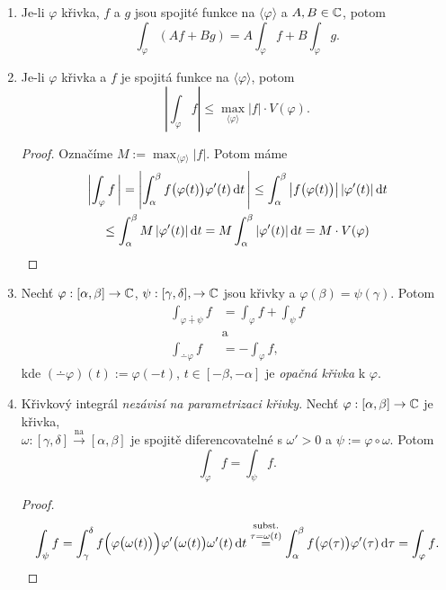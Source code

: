 \begin{propertiesBasic}
\mbox{}
\vspace{-2em}
\begin{enumerate}
    \item Je-li $\varphi$ křivka, $f$ a $g$ jsou spojité funkce na $\langle\varphi\rangle$ a $A,B \in \operatorname{\mathbb{C}}  $, potom $$\int_\varphi (Af+Bg)=A\int_\varphi f+B\int_\varphi g.$$
    \item Je-li $\varphi$ křivka a $f$ je spojitá funkce na $\langle\varphi\rangle$, potom $$\left|\int_\varphi f\right|\leq\max_{\langle\varphi\rangle}|f|\cdot V(\varphi).$$
    \begin{proof}
     Označíme $M:=\max_{\langle\varphi\rangle}|f|$. Potom máme
     \begin{multline*}
     \left|\int_\varphi f\, \right|=
     \left| \int_\alpha^\beta f\bigl(\varphi(t)\bigr) \varphi'(t) \mathop{}\!\mathrm{d} t \, \right|
     \leq\int_\alpha^\beta\left|f\bigl(\varphi(t)\bigr)\right|\left|\varphi'(t)\right|\mathop{}\!\mathrm{d} t\\
     \leq\int_\alpha^\beta M\left|\varphi'(t)\right|\mathop{}\!\mathrm{d} t =M\int_\alpha^\beta \left|\varphi'(t)\right|\mathop{}\!\mathrm{d} t
     = M\cdot V(\varphi)
     \end{multline*}
    \end{proof}
    \item Nechť %
    $\varphi:[\alpha,\beta]\rightarrow\operatorname{\mathbb{C}}  $, $\psi:[\gamma,\delta],\rightarrow\operatorname{\mathbb{C}}  $ jsou křivky a $\varphi(\beta)=\psi(\gamma)$. Potom 
    \begin{align*}
        \int_{\varphi\dotplus\psi}f&=\int_\varphi f+\int_\psi f \\ 
        &\text{a} \\
        \int_{\dotminus \varphi}f&=-\int_\varphi f\text{,}
    \end{align*}
    kde $(\dotminus \varphi)(t):=\varphi(-t)$, $t\in[-\beta,-\alpha]$ je \emph{opačná křivka} k %
    $\varphi$.
    \item Křivkový integrál \emph{nezávisí na parametrizaci křivky}. Nechť $\varphi:[\alpha,\beta]\rightarrow\operatorname{\mathbb{C}}  $ je křivka,\\
    $\omega:[\gamma,\delta]\xrightarrow{\text{na}}[\alpha,\beta]$ je spojitě diferencovatelné s $\omega'>0$ a $\psi:=\varphi\circ\omega$. %
    Potom $$\int_\varphi f = \int_\psi f\text{.}$$
    \begin{proof}
    \begin{equation*}
        \int_\psi f=
    \int_\gamma^\delta f\Bigl(\varphi\bigl(\omega(t)\bigr)\Bigr) \varphi'\bigl(\omega(t)\bigr)\omega'(t)\mathop{}\!\mathrm{d} t
     \stackrel{\text{subst.}}{\stackrel{\tau=\omega(t)}{=}}
    \int_\alpha^\beta f\bigl(\varphi(\tau)\bigr) \varphi'(\tau)\mathop{}\!\mathrm{d} \tau=\int_\varphi f \text{.} 
    \end{equation*}
    \end{proof}
\end{enumerate}
\end{propertiesBasic}
